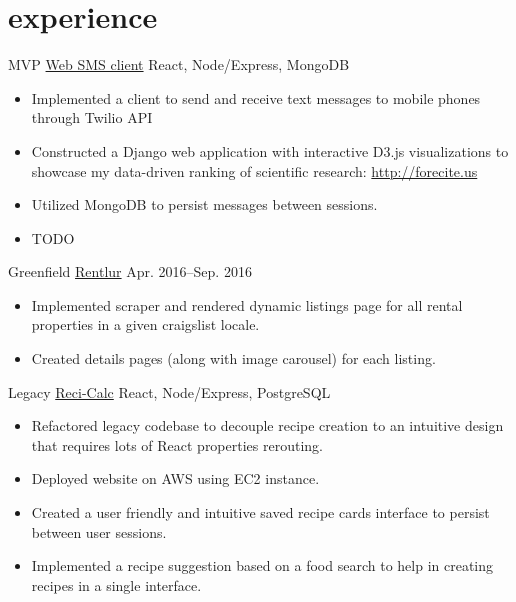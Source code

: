 
\section{experience}

\begin{entrylist}


\entry
{MVP}
{\href{}{Web SMS client}}
{React, Node/Express, MongoDB}
{\begin{itemize}
\item Implemented a client to send and receive text messages to mobile phones through Twilio API
\item Constructed a Django web application with interactive D3.js visualizations to showcase my data-driven ranking of scientific research: \href{http://forecite.us}{http://forecite.us}
\item Utilized MongoDB to persist messages between sessions.
\item TODO
\end{itemize}}


\entry
{Greenfield}
{\href{}{Rentlur}}
{Apr. 2016--Sep. 2016}
{\begin{itemize}
\item Implemented scraper and rendered dynamic listings page for all rental properties in a given craigslist locale.
\item Created details pages (along with image carousel) for each listing.
\end{itemize}}


\entry
{Legacy}
{\href{https://narrativescience.com/}{Reci-Calc}}
{React, Node/Express, PostgreSQL}
{\begin{itemize}
\item Refactored legacy codebase to decouple recipe creation to an intuitive design that requires lots of React properties rerouting.
\item  Deployed website on AWS using EC2 instance.
\item  Created a user friendly and intuitive saved recipe cards interface to persist between user sessions. 
\item Implemented a recipe suggestion based on a food search to help in creating recipes in a single interface. 
\end{itemize}}


\end{entrylist}
